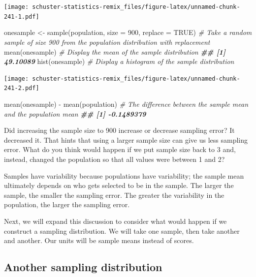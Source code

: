 \documentclass[
]{book}
\newenvironment{Shaded}{\begin{snugshade}}{\end{snugshade}}
\newcommand{\AttributeTok}[1]{\textcolor[rgb]{0.77,0.63,0.00}{#1}}
\newcommand{\CommentTok}[1]{\textcolor[rgb]{0.56,0.35,0.01}{\textit{#1}}}
\newcommand{\ConstantTok}[1]{\textcolor[rgb]{0.00,0.00,0.00}{#1}}
\newcommand{\DecValTok}[1]{\textcolor[rgb]{0.00,0.00,0.81}{#1}}
\newcommand{\DocumentationTok}[1]{\textcolor[rgb]{0.56,0.35,0.01}{\textbf{\textit{#1}}}}
\newcommand{\FunctionTok}[1]{\textcolor[rgb]{0.00,0.00,0.00}{#1}}
\newcommand{\NormalTok}[1]{#1}
\newcommand{\OtherTok}[1]{\textcolor[rgb]{0.56,0.35,0.01}{#1}}
\newcommand{\SpecialCharTok}[1]{\textcolor[rgb]{0.00,0.00,0.00}{#1}}
\begin{document}
\texttt{[image: schuster-statistics-remix\_files/figure-latex/unnamed-chunk-241-1.pdf]}

\begin{Shaded}
\begin{Highlighting}[]
\NormalTok{onesample }\OtherTok{\textless{}{-}} \FunctionTok{sample}\NormalTok{(population, }\AttributeTok{size =} \DecValTok{900}\NormalTok{, }\AttributeTok{replace =} \ConstantTok{TRUE}\NormalTok{) }\CommentTok{\# Take a random sample of size 900 from the population distribution with replacement}
\FunctionTok{mean}\NormalTok{(onesample) }\CommentTok{\# Display the mean of the sample distribution}
\DocumentationTok{\#\# [1] 49.10089}
\FunctionTok{hist}\NormalTok{(onesample) }\CommentTok{\# Display a histogram of the sample distribution}
\end{Highlighting}
\end{Shaded}

\texttt{[image: schuster-statistics-remix\_files/figure-latex/unnamed-chunk-241-2.pdf]}

\begin{Shaded}
\begin{Highlighting}[]
\FunctionTok{mean}\NormalTok{(onesample) }\SpecialCharTok{{-}} \FunctionTok{mean}\NormalTok{(population) }\CommentTok{\# The difference between the sample mean and the population mean}
\DocumentationTok{\#\# [1] {-}0.1489379}
\end{Highlighting}
\end{Shaded}

Did increasing the sample size to 900 increase or decrease sampling error? It decreased it. That hints that using a larger sample size can give us less sampling error. What do you think would happen if we put sample size back to 3 and, instead, changed the population so that all values were between 1 and 2?

Samples have variability because populations have variability; the sample mean ultimately depends on who gets selected to be in the sample. The larger the sample, the smaller the sampling error. The greater the variability in the population, the larger the sampling error.

Next, we will expand this discussion to consider what would happen if we construct a sampling distribution. We will take one sample, then take another and another. Our units will be sample means instead of scores.

\hypertarget{another-sampling-distribution}{%
\subsection{Another sampling distribution}\label{another-sampling-distribution}}
\end{document}
